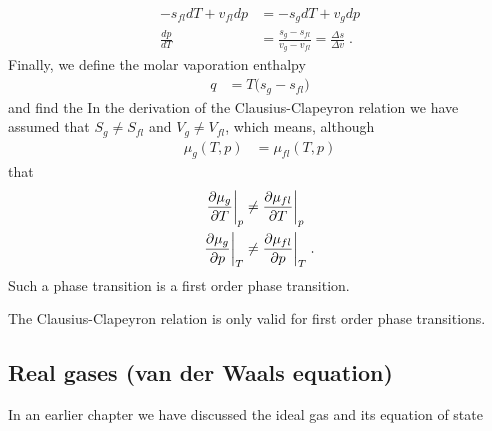 \begin{align*}
- s_{fl}  dT + v_{fl} dp &= - s_{g}  dT + v_{g} dp \\
\frac{dp}{dT} &= \frac{s_{g}-s_{fl}}{v_{g}-v_{fl}} = \frac{\Delta s}{\Delta v}\;.
\end{align*}
Finally, we define the molar vaporation enthalpy
%
\begin{align*}
q &= T\big( s_{g}-s_{fl} \big)
\end{align*}
%
and find the
In the derivation of the Clausius-Clapeyron relation we have assumed that $ S_{g}\ne S_{fl}$
and $V_{g}\ne V_{fl}$, which means, although 
%
\begin{align*}
\mu_{g}(T,p) &=\mu_{fl}(T,p) 
\end{align*}
%
that
%
\begin{align*}
\frac{\partial \mu_{g}}{\partial T}\bigg|_{p} &\ne \frac{\partial \mu_{fl}}{\partial T}\bigg|_{p}\\
\frac{\partial \mu_{g}}{\partial p}\bigg|_{T} &\ne \frac{\partial \mu_{fl}}{\partial p}\bigg|_{T}\;.
\end{align*}
%
Such a phase transition is a first order phase transition.

The Clausius-Clapeyron relation is only valid for first order phase transitions.

\subsection{Real gases (van der Waals equation)}
In an  earlier chapter we have discussed the ideal gas and its equation of state

